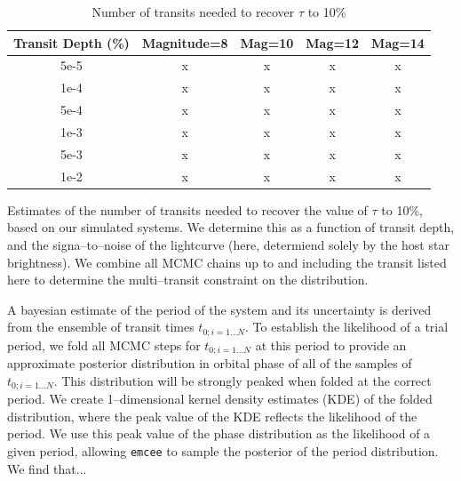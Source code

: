\begin{table}[t]
\begin{center}
\caption{\label{table-taurun} Number of transits needed to recover $\tau$ to 10\%}
\begin{tabular}{c|cccc}
\hline \hline
Transit Depth (\%) & Magnitude=8 & Mag=10 & Mag=12 & Mag=14\\
\hline
5e-5 & x & x & x & x \\
1e-4 & x & x & x & x \\
5e-4 & x & x & x & x \\
1e-3 & x & x & x & x \\
5e-3 & x & x & x & x \\
1e-2 & x & x & x & x \\
\hline
\end{tabular}
\end{center}
Estimates of the number of transits needed to recover the value of
$\tau$ to 10\%, based on our simulated systems.  We determine this as
a function of transit depth, and the signa--to--noise of the
lightcurve (here, determiend solely by the host star brightness).  We
combine all MCMC chains up to and including the transit listed here to
determine the multi--transit constraint on the distribution.
\end{table}

A bayesian estimate of the period of the system and its uncertainty is
derived from the ensemble of transit times $t_{0;i=1...N}$.  To
establish the likelihood of a trial period, we fold all MCMC steps for
$t_{0;i=1...N}$ at this period to provide an approximate posterior
distribution in orbital phase of all of the samples of
$t_{0;i=1...N}$.  This distribution will be strongly peaked when
folded at the correct period.  We create 1--dimensional kernel density
estimates (KDE) of the folded distribution, where the peak value of
the KDE reflects the likelihood of the period.  We use this peak value
of the phase distribution as the likelihood of a given period,
allowing {\tt emcee} to sample the posterior of the period
distribution.  We find that...

